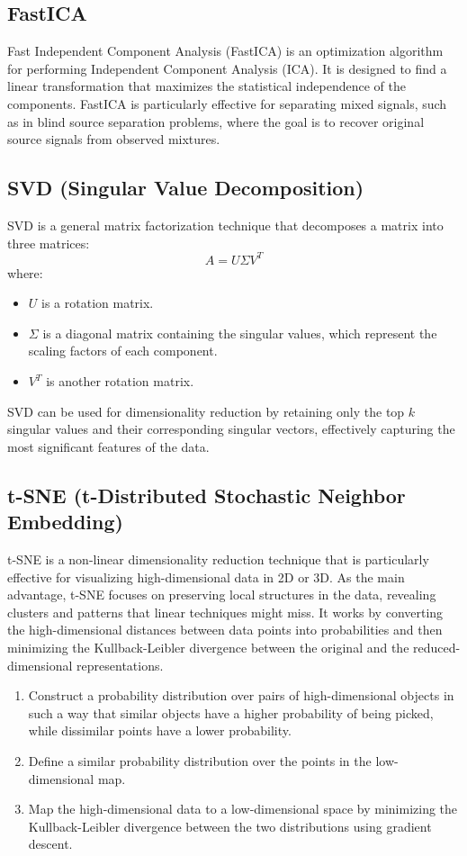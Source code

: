 \subsection{FastICA}

Fast Independent Component Analysis (FastICA) is an optimization algorithm for performing Independent Component Analysis (ICA). It is designed to find a linear transformation that maximizes the statistical independence of the components. FastICA is particularly effective for separating mixed signals, such as in blind source separation problems, where the goal is to recover original source signals from observed mixtures.

\subsection{SVD (Singular Value Decomposition)}

SVD is a general matrix factorization technique that decomposes a matrix into three matrices:
\begin{equation*}
    A = U \Sigma V^T
\end{equation*}
where:
\begin{itemize}
    \item $U$ is a rotation matrix.
    \item $\Sigma$ is a diagonal matrix containing the singular values, which represent the scaling factors of each component.
    \item $V^T$ is another rotation matrix.
\end{itemize}
SVD can be used for dimensionality reduction by retaining only the top $k$ singular values and their corresponding singular vectors, effectively capturing the most significant features of the data.

\subsection{t-SNE (t-Distributed Stochastic Neighbor Embedding)}

t-SNE is a non-linear dimensionality reduction technique that is particularly effective for visualizing high-dimensional data in 2D or 3D. As the main advantage, t-SNE focuses on preserving local structures in the data, revealing clusters and patterns that linear techniques might miss. It works by converting the high-dimensional distances between data points into probabilities and then minimizing the Kullback-Leibler divergence between the original and the reduced-dimensional representations.
\begin{enumerate}
    \item Construct a probability distribution over pairs of high-dimensional objects in such a way that similar objects have a higher probability of being picked, while dissimilar points have a lower probability.
    \item Define a similar probability distribution over the points in the low-dimensional map.
    \item Map the high-dimensional data to a low-dimensional space by minimizing the Kullback-Leibler divergence between the two distributions using gradient descent.
\end{enumerate}

